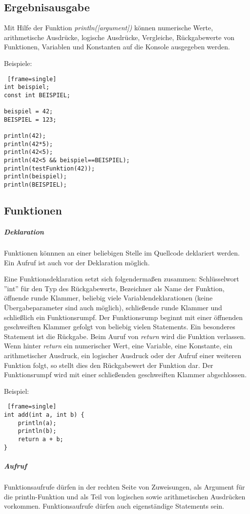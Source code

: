 \subsection*{Ergebnisausgabe}
Mit Hilfe der Funktion \textit{println([argument])} können numerische Werte, arithmetische Ausdrücke, logische Ausdrücke, Vergleiche, Rückgabewerte von Funktionen, Variablen und Konstanten auf die Konsole ausgegeben werden.

Beispiele:
\begin{lstlisting} [frame=single] 
int beispiel;
const int BEISPIEL;

beispiel = 42;
BEISPIEL = 123;

println(42);
println(42*5);
println(42<5);
println(42<5 && beispiel==BEISPIEL);
println(testFunktion(42));
println(beispiel);
println(BEISPIEL);
\end{lstlisting}


\subsection{Funktionen}

\subparagraph{Deklaration}
Funktionen könnnen an einer beliebigen Stelle im Quellcode deklariert werden. Ein Aufruf ist auch vor der Deklaration möglich.

Eine Funktionsdeklaration setzt sich folgendermaßen zusammen:
Schlüsselwort ''int'' für den Typ des Rückgabewerts, Bezeichner als Name der Funktion, öffnende runde Klammer, beliebig viele Variablendeklarationen (keine Übergabeparameter sind auch möglich), schließende runde Klammer und schließlich ein Funktionsrumpf.
Der Funktionsrump beginnt mit einer öffnenden geschweiften Klammer gefolgt von beliebig vielen Statements. 
Ein besonderes Statement ist die Rückgabe. Beim Auruf von \textit{return} wird die Funktion verlassen. Wenn hinter \textit{return} ein numerischer Wert, eine Variable, eine Konstante, ein arithmetischer Ausdruck, ein logischer Ausdruck oder der Aufruf einer weiteren Funktion folgt, so stellt dies den Rückgabewert der Funktion dar.
Der Funktionsrumpf wird mit einer schließenden geschweiften Klammer abgschlossen.

Beispiel:
\begin{lstlisting} [frame=single] 
int add(int a, int b) {
	println(a);
	println(b);
	return a + b;
}
\end{lstlisting}

\subparagraph{Aufruf}
Funktionsaufrufe dürfen in der rechten Seite von Zuweisungen, als Argument für die println-Funktion und als Teil von logischen sowie arithmetischen Ausdrücken vorkommen. Funktionsaufrufe dürfen auch eigenständige Statements sein.


